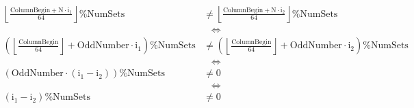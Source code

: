 \documentclass[10pt]{article}
\begin{document}
\begin{align*}
  \mathrm{\left\lfloor \frac{ColumnBegin + N \cdot i_1}{64} \right\rfloor \% NumSets}
  &\ne
  \mathrm{\left\lfloor \frac{ColumnBegin + N \cdot i_2}{64} \right\rfloor \% NumSets}
  \\
  &\;\;\;\Leftrightarrow
  \\
  \mathrm{\left( \left\lfloor \frac{ColumnBegin}{64} \right\rfloor + OddNumber \cdot i_1 \right) \% NumSets}
  &\ne
  \mathrm{\left( \left\lfloor \frac{ColumnBegin}{64} \right\rfloor + OddNumber \cdot i_2 \right) \% NumSets}
  \\
  &\;\;\;\Leftrightarrow
  \\
  \mathrm{\left( OddNumber \cdot \left( i_1 - i_2 \right) \right ) \% NumSets}
  &\ne
  \mathrm{0}
  \\
  &\;\;\;\Leftrightarrow
  \\
  \mathrm{\left( i_1 - i_2 \right) \% NumSets}
  &\ne
  \mathrm{0}
\end{align*}
\end{document}
